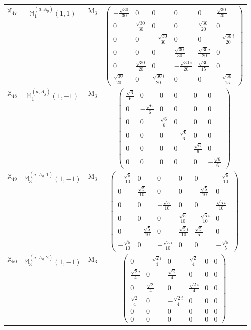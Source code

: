 \documentclass[fleqn,10pt,landscape]{article}
\begin{document}
\begin{itemize}
\begin{center}
\begin{longtable}{c|c|c|c}
$ \mathbb{X}_{47} $ & $\mathbb{M}_{1}^{(a,A_{g})}(1,1)$ & M$_{3}$ & $\begin{pmatrix} - \frac{\sqrt{30}}{30} & 0 & 0 & 0 & 0 & \frac{\sqrt{30}}{20} \\ 0 & \frac{\sqrt{30}}{30} & 0 & 0 & \frac{\sqrt{30}}{20} & 0 \\ 0 & 0 & - \frac{\sqrt{30}}{30} & 0 & 0 & - \frac{\sqrt{30} i}{20} \\ 0 & 0 & 0 & \frac{\sqrt{30}}{30} & \frac{\sqrt{30} i}{20} & 0 \\ 0 & \frac{\sqrt{30}}{20} & 0 & - \frac{\sqrt{30} i}{20} & \frac{\sqrt{30}}{15} & 0 \\ \frac{\sqrt{30}}{20} & 0 & \frac{\sqrt{30} i}{20} & 0 & 0 & - \frac{\sqrt{30}}{15} \end{pmatrix}$ \\
$ \mathbb{X}_{48} $ & $\mathbb{M}_{1}^{(a,A_{g})}(1,-1)$ & M$_{3}$ & $\begin{pmatrix} \frac{\sqrt{6}}{6} & 0 & 0 & 0 & 0 & 0 \\ 0 & - \frac{\sqrt{6}}{6} & 0 & 0 & 0 & 0 \\ 0 & 0 & \frac{\sqrt{6}}{6} & 0 & 0 & 0 \\ 0 & 0 & 0 & - \frac{\sqrt{6}}{6} & 0 & 0 \\ 0 & 0 & 0 & 0 & \frac{\sqrt{6}}{6} & 0 \\ 0 & 0 & 0 & 0 & 0 & - \frac{\sqrt{6}}{6} \end{pmatrix}$ \\
$ \mathbb{X}_{49} $ & $\mathbb{M}_{3}^{(a,A_{g},1)}(1,-1)$ & M$_{3}$ & $\begin{pmatrix} - \frac{\sqrt{5}}{10} & 0 & 0 & 0 & 0 & - \frac{\sqrt{5}}{10} \\ 0 & \frac{\sqrt{5}}{10} & 0 & 0 & - \frac{\sqrt{5}}{10} & 0 \\ 0 & 0 & - \frac{\sqrt{5}}{10} & 0 & 0 & \frac{\sqrt{5} i}{10} \\ 0 & 0 & 0 & \frac{\sqrt{5}}{10} & - \frac{\sqrt{5} i}{10} & 0 \\ 0 & - \frac{\sqrt{5}}{10} & 0 & \frac{\sqrt{5} i}{10} & \frac{\sqrt{5}}{5} & 0 \\ - \frac{\sqrt{5}}{10} & 0 & - \frac{\sqrt{5} i}{10} & 0 & 0 & - \frac{\sqrt{5}}{5} \end{pmatrix}$ \\
$ \mathbb{X}_{50} $ & $\mathbb{M}_{3}^{(a,A_{g},2)}(1,-1)$ & M$_{3}$ & $\begin{pmatrix} 0 & - \frac{\sqrt{2} i}{4} & 0 & \frac{\sqrt{2}}{4} & 0 & 0 \\ \frac{\sqrt{2} i}{4} & 0 & \frac{\sqrt{2}}{4} & 0 & 0 & 0 \\ 0 & \frac{\sqrt{2}}{4} & 0 & \frac{\sqrt{2} i}{4} & 0 & 0 \\ \frac{\sqrt{2}}{4} & 0 & - \frac{\sqrt{2} i}{4} & 0 & 0 & 0 \\ 0 & 0 & 0 & 0 & 0 & 0 \\ 0 & 0 & 0 & 0 & 0 & 0 \end{pmatrix}$ \\

\end{longtable}
\end{center}
\end{itemize}
\end{document}
